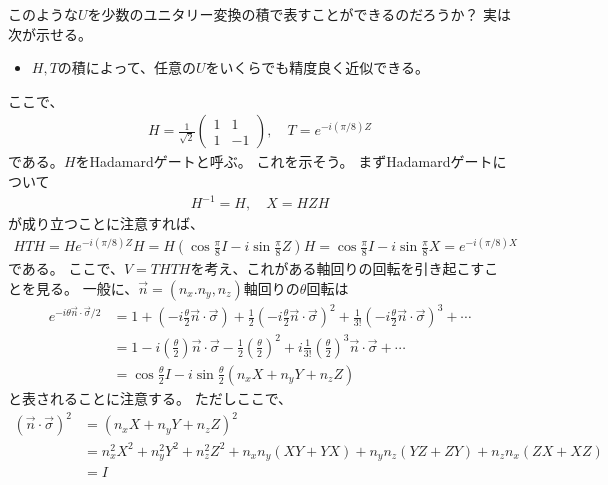 \documentclass[]{ltjsarticle}
\begin{document}
このような$U$を少数のユニタリー変換の積で表すことができるのだろうか？
実は次が示せる。
\begin{itemize}
    \item $H,T$の積によって、任意の$U$をいくらでも精度良く近似できる。
\end{itemize}
ここで、
\begin{align}
    H 
    = 
    \frac{1}{\sqrt{2}}
    \begin{pmatrix}
        1 & 1 \\
        1 & -1
    \end{pmatrix}, \quad 
    T
    = 
    e^{-i(\pi/8)Z}
\end{align}
である。$H$をHadamardゲートと呼ぶ。
これを示そう。
まずHadamardゲートについて
\begin{align}
    H^{-1} = H, \quad 
    X = HZH
\end{align}
が成り立つことに注意すれば、
\begin{align}
    HTH 
    = 
    He^{-i(\pi/8)Z}H 
    =
    H\left( 
        \cos\frac{\pi}{8}I - i\sin\frac{\pi}{8}Z
    \right)H
    =
    \cos\frac{\pi}{8}I - i\sin\frac{\pi}{8}X
    =
    e^{-i(\pi/8)X}
\end{align}
である。
ここで、$V = THTH$を考え、これがある軸回りの回転を引き起こすことを見る。
一般に、$\vec{n} = (n_x. n_y, n_z)$軸回りの$\theta$回転は
\begin{align}
    e^{-i\theta \vec{n}\cdot\vec{\sigma}/2}
    &=
    1 
    + \left( -i\frac{\theta}{2}\vec{n}\cdot\vec{\sigma} \right)
    + \frac{1}{2}\left( -i\frac{\theta}{2} \vec{n}\cdot\vec{\sigma} \right)^2
    + \frac{1}{3!}\left( -i\frac{\theta}{2} \vec{n}\cdot\vec{\sigma} \right)^3 
    + \cdots \\
    &=
    1 
    - i \left( \frac{\theta}{2} \right) \vec{n}\cdot\vec{\sigma}
    - \frac{1}{2}\left( \frac{\theta}{2} \right)^2
    + i \frac{1}{3!}\left( \frac{\theta}{2} \right)^3 \vec{n}\cdot\vec{\sigma} 
    + \cdots \\
    &=
    \cos\frac{\theta}{2}I 
    -
    i\sin\frac{\theta}{2}
    (n_xX + n_yY + n_zZ)
\end{align}
と表されることに注意する。
ただしここで、
\begin{align}
    (\vec{n}\cdot\vec{\sigma})^2
    &=
    (n_x X + n_y Y + n_z Z)^2 \\
    &=
    n_x^2 X^2 + n_y^2 Y^2 + n_z^2 Z^2
    + n_xn_y (XY + YX)
    + n_yn_z (YZ + ZY)
    + n_zn_x (ZX + XZ) \\
    &=
    I
\end{align}
\end{document}
